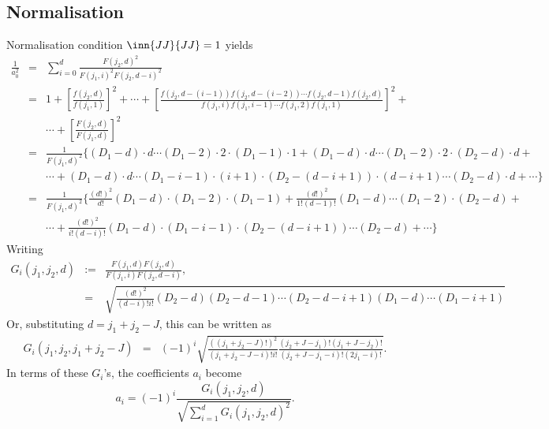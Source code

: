 \documentclass{article}
\begin{document}
\subsection{Normalisation}
\label{sec-4-2}
Normalisation condition $\inn{JJ}{JJ}=1$ yields
\begin{eqnarray}
 \frac{1}{a_{0}^2} & = & \sum_{i=0}^{d}\frac{F(j_2,d)^2}{F(j_1,i)^2F(j_2,d-i)^2}\\
                   & = & 1+\left[ \frac{f(j_2,d)}{f(j_1,1)} \right]^2+ \cdots + \left[\frac{f(j_2,d-(i-1))f(j_2,d-(i-2)) \cdots f(j_2,d-1)f(j_2,d)}{f(j_1,i)f(j_1,i-1) \cdots f(j_1,2)f(j_1,1)}\right]^2 + \nonumber\\
                   & &   \cdots + \left[\frac{F(j_2,d)}{F(j_1,d)} \right]^2 \nonumber\\
                   & = & \frac{1}{F(j_1,d)^2} \bigg\{ (D_1-d)\cdot d\cdots (D_1-2)\cdot 2 \cdot (D_1 -1) \cdot 1 +(D_1-d)\cdot d\cdots (D_1-2)\cdot 2 \cdot (D_2-d)\cdot d + \nonumber\\
                   & &   \cdots + (D_1-d)\cdot d\cdots (D_1-i-1)\cdot (i+1) \cdot (D_2 -(d-i+1)) \cdot (d-i+1) \cdots (D_2-d)\cdot d + \cdots \bigg\} \nonumber\\
                   & = & \frac{1}{F(j_1,d)^2} \bigg\{ \frac{(d!)^2}{d!}(D_1-d)\cdot  (D_1-2)\cdot  (D_1 -1)  + \frac{(d!)^2}{1!(d-1)!}(D_1-d)\cdots (D_1-2) \cdot (D_2-d) + \nonumber\\
                   & &   \cdots + \frac{(d!)^2}{i!(d-i)!}(D_1-d)\cdot (D_1-i-1) \cdot (D_2 -(d-i+1)) \cdots (D_2-d) + \cdots \bigg\} \nonumber
\end{eqnarray}
Writing 
\begin{eqnarray}
 G_i(j_1,j_2,d) &:=& \frac{F(j_1,d)F(j_2,d)}{F(j_1,i)F(j_2,d-i)}, \\
                & = & \sqrt{\frac{(d!)^2}{(d-i)!i!}(D_2 - d)(D_2 -d-1)\cdots(D_2 - d -i+1)(D_1 - d) \cdots (D_1 - i +1)} \nonumber
\end{eqnarray}
Or, substituting  $d = j_1+j_2 -J$, this can be written as
\begin{eqnarray}
G_i(j_1,j_2,j_1+j_2 -J) & = & (-1)^i\sqrt{\frac{((j_1+j_2 -J)!)^2}{(j_1+j_2-J-i)!i!}\frac{(j_2+J-j_1)!(j_1+J-j_2)!}{(j_2+J-j_1 -i)!(2j_1  - i)!}}. \nonumber
\end{eqnarray}
In terms of these $G_i$'s, the coefficients $a_i$ become
\begin{equation}
\label{ }
a_i = (-1)^i\frac{G_i(j_1,j_2,d)}{\sqrt{\sum_{i=1}^{d}G_i(j_1,j_2,d)^2}}.
\end{equation}
\end{document}
